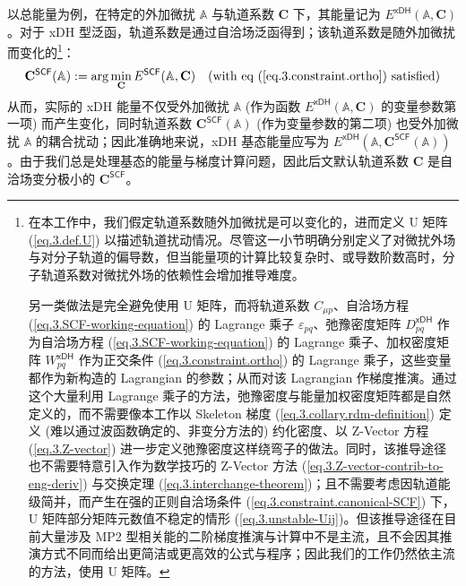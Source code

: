 以总能量为例，在\textsf{特定的}外加微扰 $\mathbb{A}$ 与轨道系数 $\mathbf{C}$ 下，其能量记为 $E^\textsf{xDH} (\mathbb{A}, \mathbf{C})$。对于 xDH 型泛函，轨道系数是通过自洽场泛函得到；该轨道系数是随外加微扰而变化的\footnote{在本工作中，我们假定轨道系数随外加微扰是可以变化的，进而定义 U 矩阵 (\ref{eq.3.def.U}) 以描述轨道扰动情况\cite{Handy-Schaefer.JCP.1984}。尽管这一小节明确分别定义了对微扰外场与对分子轨道的偏导数，但当能量项的计算比较复杂时、或导数阶数高时，分子轨道系数对微扰外场的依赖性会增加推导难度。

另一类做法是完全避免使用 U 矩阵，而将轨道系数 $C_{\mu p}$、自洽场方程 (\ref{eq.3.SCF-working-equation}) 的 Lagrange 乘子 $\varepsilon_{pq}$、弛豫密度矩阵 $D_{pq}^\textsf{xDH}$ 作为自洽场方程 (\ref{eq.3.SCF-working-equation}) 的 Lagrange 乘子、加权密度矩阵 $W_{pq}^\textsf{xDH}$ 作为正交条件 (\ref{eq.3.constraint.ortho}) 的 Lagrange 乘子，这些变量都作为新构造的 Lagrangian 的参数；从而对该 Lagrangian 作梯度推演\cite{Helgaker-Joergensen.TCA.1989, Burow-Eshuis.JCTC.2014}。通过这个大量利用 Lagrange 乘子的方法，弛豫密度与能量加权密度矩阵都是自然定义的，而不需要像本工作以 Skeleton 梯度 (\ref{eq.3.collary.rdm-definition}) 定义 (难以通过波函数确定的、非变分方法的) 约化密度、以 Z-Vector 方程 (\ref{eq.3.Z-vector}) 进一步定义弛豫密度这样绕弯子的做法。同时，该推导途径也不需要特意引入作为数学技巧的 Z-Vector 方法 (\ref{eq.3.Z-vector-contrib-to-eng-deriv}) 与交换定理 (\ref{eq.3.interchange-theorem})；且不需要考虑因轨道能级简并，而产生在强的正则自洽场条件 (\ref{eq.3.constraint.canonical-SCF}) 下，U 矩阵部分矩阵元数值不稳定的情形 (\ref{eq.3.unstable-Uij})。但该推导途径在目前大量涉及 MP2 型相关能的二阶梯度推演与计算中不是主流，且不会因其推演方式不同而给出更简洁或更高效的公式与程序；因此我们的工作仍然依主流的方法，使用 U 矩阵。\label{footnote.full-lagrangian}}：
\begin{equation*}
  \mathbf{C}^\textsf{SCF} (\mathbb{A}) := \arg \min_\mathbf{C} E^\textsf{SCF} (\mathbb{A}, \mathbf{C}) \quad \text{(with eq (\ref{eq.3.constraint.ortho}) satisfied)}
\end{equation*}
从而，实际的 xDH 能量不仅受外加微扰 $\mathbb{A}$ (作为函数 $E^\textsf{xDH} (\mathbb{A}, \mathbf{C})$ 的变量参数第一项) 而产生变化，同时轨道系数 $\mathbf{C}^\textsf{SCF} (\mathbb{A})$ (作为变量参数的第二项) 也受外加微扰 $\mathbb{A}$ 的耦合扰动；因此准确地来说，xDH \textsf{基态能量}应写为 $E^\textsf{xDH} (\mathbb{A}, \mathbf{C}^\textsf{SCF} (\mathbb{A}))$。由于我们总是处理基态的能量与梯度计算问题，因此后文默认轨道系数 $\mathbf{C}$ 是自洽场变分极小的 $\mathbf{C}^\textsf{SCF}$。

